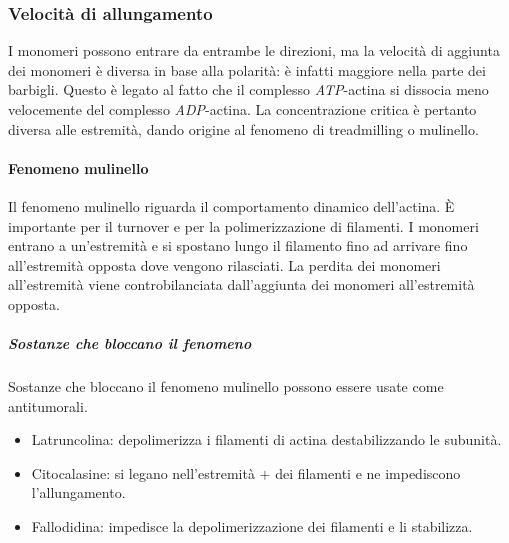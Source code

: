		\subsubsection{Velocit\`a di allungamento}
		I monomeri possono entrare da entrambe le direzioni, ma la velocit\`a di aggiunta dei monomeri \`e diversa in base alla polarit\`a: \`e infatti maggiore nella parte dei barbigli.
		Questo \`e legato al fatto che il complesso \emph{ATP}-actina si dissocia meno velocemente del complesso \emph{ADP}-actina.
		La concentrazione critica \`e pertanto diversa alle estremit\`a, dando origine al fenomeno di treadmilling o mulinello.

			\paragraph{Fenomeno mulinello}
			Il fenomeno mulinello riguarda il comportamento dinamico dell'actina.
			\`E importante per il  turnover e per la polimerizzazione di filamenti.
			I monomeri entrano a un'estremit\`a e si spostano lungo il filamento fino ad arrivare fino all'estremit\`a opposta dove vengono rilasciati.
			La perdita dei monomeri all'estremit\`a viene controbilanciata dall'aggiunta dei monomeri all'estremit\`a opposta.

				\subparagraph{Sostanze che bloccano il fenomeno}
				Sostanze che bloccano il fenomeno mulinello possono essere usate come antitumorali.
				\begin{multicols}{2}
					\begin{itemize}
						\item Latruncolina: depolimerizza i filamenti di actina destabilizzando le subunit\`a.
						\item Citocalasine: si legano nell'estremit\`a $+$ dei filamenti e ne impediscono l'allungamento.
						\item Fallodidina: impedisce la depolimerizzazione dei filamenti e li stabilizza.
					\end{itemize}
				\end{multicols}

